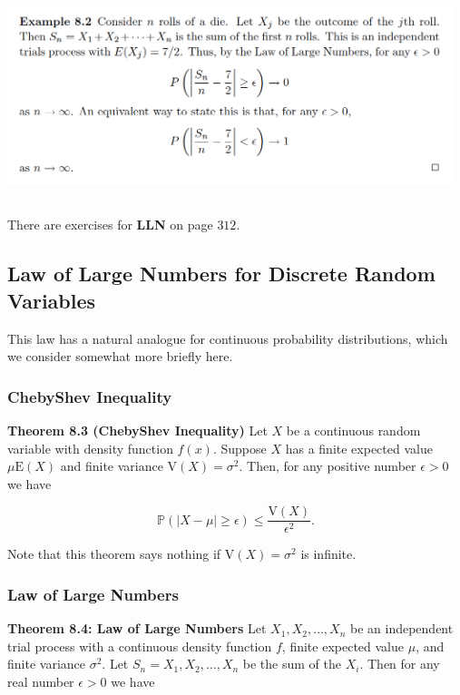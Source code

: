 \documentclass[12pt]{article}
\newcommand{\prob}[1]{\mathbb{P}(#1)}
\newcommand{\expected}[1]{\text{E}(#1)}
\newcommand{\variance}[1]{\text{V}(#1)}
\begin{document}
\begin{center}
\includegraphics[width=13cm, height=6cm]{DIE_ROLLING_EXAMPLE}
\end{center}

\noindent
There are exercises for \textbf{LLN} on page $312$.


\subsection*{Law of Large Numbers for Discrete Random Variables}
This law has a natural analogue for continuous probability distributions, which we consider somewhat more briefly here.

\subsubsection*{ChebyShev Inequality}
\noindent
\textbf{Theorem 8.3 (ChebyShev Inequality)} Let $X$ be a continuous random variable with density function $f(x)$. Suppose $X$ has a finite expected value $\mu \expected{X}$ and finite variance $\variance{X} = \sigma^2$. Then, for any positive number $\epsilon > 0$ we have

\begin{equation*}
\prob{\lvert X - \mu \rvert \geq \epsilon} \leq \frac{\variance{X}}{\epsilon^2}.
\end{equation*}

\noindent
Note that this theorem says nothing if $\variance{X} = \sigma^2$ is infinite.

\subsubsection*{Law of Large Numbers}
\noindent
\textbf{Theorem 8.4: Law of Large Numbers} Let $X_1, X_2, \ldots, X_n$ be an independent trial process with a continuous density function $f$, finite expected value $\mu$, and finite variance $\sigma^2$. Let $S_n = X_1, X_2, \ldots, X_n$ be the sum of the $X_i$. Then for any real number $\epsilon > 0$ we have
\end{document}
